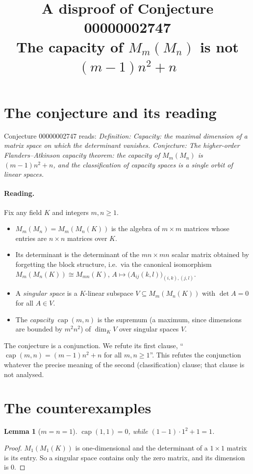 \documentclass[11pt]{article}
\title{A disproof of Conjecture 00000002747\\[2pt]
\large The capacity of $M_m(M_n)$ is not $(m-1)n^2+n$}
\date{}
\renewcommand{\_}{\oldus\allowbreak}
\newtheorem{lemma}[theorem]{Lemma}
\theoremstyle{definition}
\theoremstyle{remark}
\begin{document}
\sloppy
\maketitle

\section{The conjecture and its reading}

Conjecture 00000002747 reads: \emph{Definition: Capacity: the maximal dimension of a matrix space on
which the determinant vanishes. Conjecture: The higher-order Flanders--Atkinson capacity theorem: the
capacity of $M_m(M_n)$ is $(m-1)n^2+n$, and the classification of capacity spaces is a single orbit of
linear spaces.}

\paragraph{Reading.} Fix any field $K$ and integers $m,n\ge 1$.
\begin{itemize}
\item $M_m(M_n)=M_m(M_n(K))$ is the algebra of $m\times m$ matrices whose entries are $n\times n$
matrices over $K$.
\item Its determinant is the determinant of the $mn\times mn$ scalar matrix obtained by forgetting the
block structure, i.e.\ via the canonical isomorphism $M_m(M_n(K))\cong M_{mn}(K)$,
$A\mapsto\bigl(A_{ij}(k,l)\bigr)_{(i,k),(j,l)}$.
\item A \emph{singular space} is a $K$-linear subspace $V\subseteq M_m(M_n(K))$ with $\det A=0$ for all
$A\in V$.
\item The \emph{capacity} $\operatorname{cap}(m,n)$ is the supremum (a maximum, since dimensions are
bounded by $m^2n^2$) of $\dim_K V$ over singular spaces $V$.
\end{itemize}
The conjecture is a conjunction. We refute its first clause, ``$\operatorname{cap}(m,n)=(m-1)n^2+n$
for all $m,n\ge1$''. This refutes the conjunction whatever the precise meaning of the second
(classification) clause; that clause is not analysed.

\section{The counterexamples}

\begin{lemma}[$m=n=1$]
$\operatorname{cap}(1,1)=0$, while $(1-1)\cdot1^2+1=1$.
\end{lemma}
\begin{proof}
$M_1(M_1(K))$ is one-dimensional and the determinant of a $1\times1$ matrix is its entry. So a singular
space contains only the zero matrix, and its dimension is $0$.
\end{proof}
\end{document}
